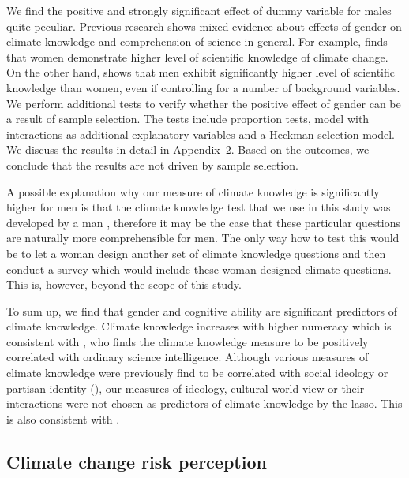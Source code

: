 \documentclass[a4paper,12pt]{article}
\begin{document}
\linespread{1}

\pagebreak



We find the positive and strongly significant effect of dummy variable for males quite peculiar. Previous research shows mixed evidence about effects of gender on climate knowledge and comprehension of science in general. For example, \citet{McCright2010} finds that women demonstrate higher level of scientific knowledge of climate change. On the other hand, \citet{Hayes2001gender} shows that men exhibit significantly higher level of scientific knowledge than women, even if controlling for a number of background variables. We perform additional tests to verify whether the positive effect of gender can be a result of sample selection. The tests include proportion tests, model with interactions as additional explanatory variables and a Heckman selection model. We discuss the results in detail in Appendix~$2$.  Based on the outcomes, we conclude that the results are not driven by sample selection.


A possible explanation why our measure of climate knowledge is significantly higher for men is that the climate knowledge test that we use in this study was developed by a man \citep{Kahan2015}, therefore it may be the case that these particular questions are naturally more comprehensible for men. The only way how to test this would be to let a woman design another set of climate knowledge questions and then conduct a survey which would include these woman-designed climate questions. This is, however, beyond the scope of this study.


 To sum up, we find that gender and cognitive ability are significant predictors of climate knowledge.  Climate knowledge increases with higher numeracy which is consistent with \citet{Kahan2015}, who finds the climate knowledge measure to be positively correlated with ordinary science intelligence. Although various measures of climate knowledge were previously find to be correlated with social ideology or partisan identity (\citealp{Hamilton2011, Kahan2012, Kellstedt2008}), our measures of ideology, cultural world-view or their interactions were not chosen as predictors of climate knowledge by the lasso. This is also consistent with \citet{Kahan2015}.




\subsection{Climate change risk perception}\label{ResPerc}
\end{document}
